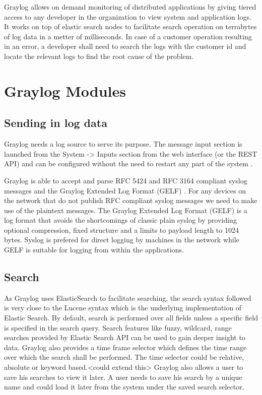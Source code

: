 \documentclass[9pt,twocolumn,twoside]{../../styles/osajnl}
\begin{document}
Graylog allows on demand monitoring of distributed applications by
giving tiered access to any developer in the organization to view
system and application logs. It works on top of elastic search nodes
to facilitate search operation on terrabytes of log data in a metter
of milliseconds. In case of a customer operation resulting in an
error, a developer shall need to search the logs with the customer id
and locate the relevant logs to find the root cause of the problem.

\section{Graylog Modules}


\subsection{Sending in log data}

Graylog needs a log source to serve its purpose. The message input
section is launched from the System -> Inputs section from the web
interface (or the REST API) and can be configured without the need to
restart any part of the system \cite{www-graylog-sending_data}.

Graylog is able to accept and parse RFC 5424 and RFC 3164 compliant
syslog messages and the Graylog Extended Log Format (GELF)
\cite{www-graylog-sending_data}. For any devices on the network that
do not publish RFC compliant syslog messages we need to make use of
the plaintext messages.  The Graylog Extended Log Format (GELF) is a
log format that avoids the shortcomings of classic plain syslog by
providing optional compression, fixed structure and a limits to
payload length to 1024 bytes. Syslog is prefered for direct logging by
machines in the network while GELF is suitable for logging from within
the applications.

\subsection{Search}

As Graylog uses ElasticSearch to facilitate searching, the search
syntax followed is very close to the Lucene syntax which is the
underlying implementation of Elastic Search. By default, search is
performed over all fields unless a specific field is specified in the
search query. Search features like fuzzy, wildcard, range searches
provided by Elastic Search API can be used to gain deeper insight to
data.  Graylog also provides a time frame selector which defines the
time range over which the search shall be performed. The time selector
could be relative, absolute or keyword based.<could extend this>
Graylog also allows a user to save his searches to view it later. A
user needs to save his search by a unique name and could load it later
from the system under the saved search selector.
 
\end{document}
